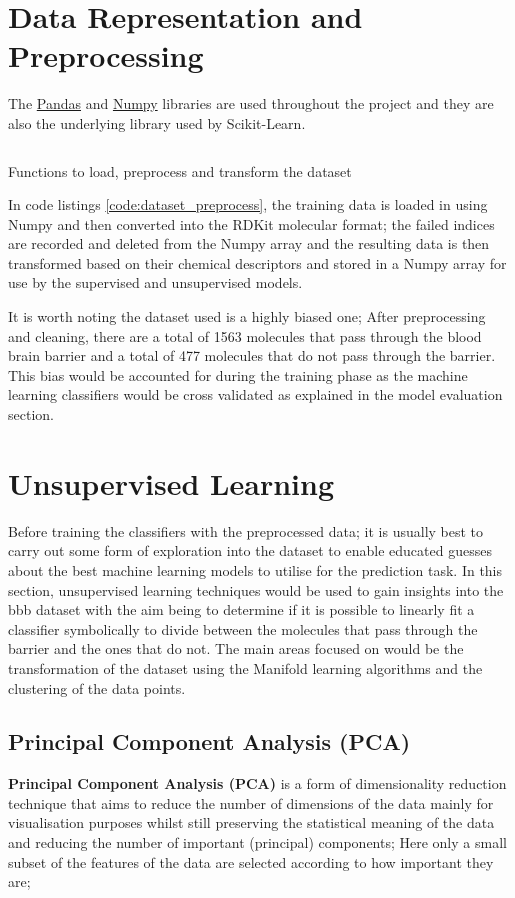 \documentclass[a4paper,12pt]{report}
\begin{document}
	\section{Data Representation and Preprocessing}
	The \href{http://pandas.pydata.org/}{Pandas} and \href{http://www.numpy.org/}{Numpy} libraries are used throughout the project and they are also the underlying library used by Scikit-Learn. 
		\begin{listing}[!htbp]
			\inputminted[breaklines=true,breakautoindent=true,linenos=true]{python}{source_code/dataset.py}
			\caption{Functions to load, preprocess and transform the dataset}
			\label{code:dataset_preprocess}
		\end{listing}
	In code listings \ref{code:dataset_preprocess}, the training data is loaded in using Numpy and then converted into the RDKit molecular format; the failed indices are recorded and deleted from the Numpy array and the resulting data is then transformed based on their chemical descriptors and stored in a Numpy array for use by the supervised and unsupervised models.
	
	It is worth noting the dataset used is a highly biased one; After preprocessing and cleaning, there are a total of 1563 molecules that pass through the blood brain barrier and a total of 477 molecules that do not pass through the barrier. This bias would be accounted for during the training phase as the machine learning classifiers would be cross validated as explained in the model evaluation section.
	
	
	
	
	
	\section{Unsupervised Learning}
	Before training the classifiers with the preprocessed data; it is usually best to carry out some form of exploration into the dataset to enable educated guesses about the best machine learning models to utilise for the prediction task. In this section, unsupervised learning techniques would be used to gain insights into the bbb dataset with the aim being to determine if it is possible to linearly fit a classifier symbolically to divide between the molecules that pass through the barrier and the ones that do not. The main areas focused on would be the transformation of the dataset using the Manifold learning algorithms and the clustering of the data points.
	
		\subsection{Principal Component Analysis (PCA)}
		\textbf{Principal Component Analysis (PCA)} is a form of dimensionality reduction technique that aims to reduce the number of dimensions of the data mainly for visualisation purposes whilst still preserving the statistical meaning of the data and reducing the number of important (principal) components; Here only a small subset of the features of the data are selected according to how important they are; 
		
\end{document}
